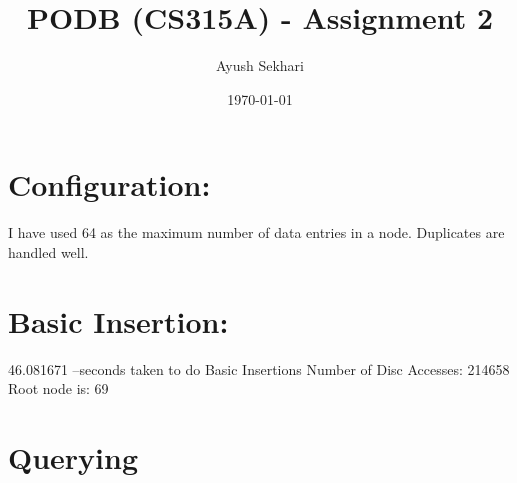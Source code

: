 \documentclass[12pt]{article}%
\begin{document}
\title{PODB (CS315A) - Assignment 2}
\author{Ayush Sekhari}
\date{\today}
\maketitle

\section{Configuration:}
I have used 64 as the maximum number of data entries in a node. 
Duplicates are handled well. 

\section{Basic Insertion:}
46.081671 --seconds taken to do Basic Insertions
Number of Disc Accesses: 214658
Root node is: 69

\section{Querying}

 
\end{document}
